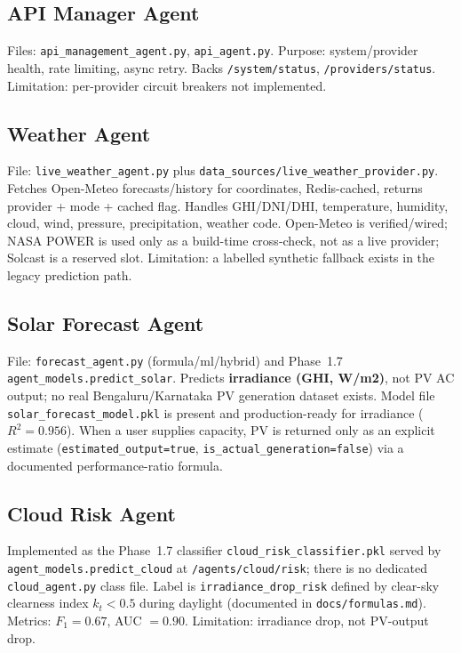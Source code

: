 \documentclass[11pt,a4paper]{article}
\newcommand{\code}[1]{\texttt{\small #1}}
\begin{document}
\subsection{API Manager Agent}
Files: \code{api\_management\_agent.py}, \code{api\_agent.py}. Purpose: system/provider
health, rate limiting, async retry. Backs \code{/system/status},
\code{/providers/status}. Limitation: per-provider circuit breakers not implemented.

\subsection{Weather Agent}
File: \code{live\_weather\_agent.py} plus \code{data\_sources/live\_weather\_provider.py}.
Fetches Open-Meteo forecasts/history for coordinates, Redis-cached, returns provider +
mode + cached flag. Handles GHI/DNI/DHI, temperature, humidity, cloud, wind, pressure,
precipitation, weather code. Open-Meteo is verified/wired; NASA POWER is used only as a
build-time cross-check, not as a live provider; Solcast is a reserved slot. Limitation: a
labelled synthetic fallback exists in the legacy prediction path.

\subsection{Solar Forecast Agent}
File: \code{forecast\_agent.py} (formula/ml/hybrid) and Phase~1.7
\code{agent\_models.predict\_solar}. Predicts \textbf{irradiance (GHI, W/m2)}, not PV AC
output; no real Bengaluru/Karnataka PV generation dataset exists. Model file
\code{solar\_forecast\_model.pkl} is present and production-ready for irradiance
($R^2=0.956$). When a user supplies capacity, PV is returned only as an explicit estimate
(\code{estimated\_output=true}, \code{is\_actual\_generation=false}) via a documented
performance-ratio formula.

\subsection{Cloud Risk Agent}
Implemented as the Phase~1.7 classifier \code{cloud\_risk\_classifier.pkl} served by
\code{agent\_models.predict\_cloud} at \code{/agents/cloud/risk}; there is no dedicated
\code{cloud\_agent.py} class file. Label is \code{irradiance\_drop\_risk} defined by
clear-sky clearness index $k_t<0.5$ during daylight (documented in
\code{docs/formulas.md}). Metrics: $F_1=0.67$, AUC $=0.90$. Limitation: irradiance drop,
not PV-output drop.
\end{document}

